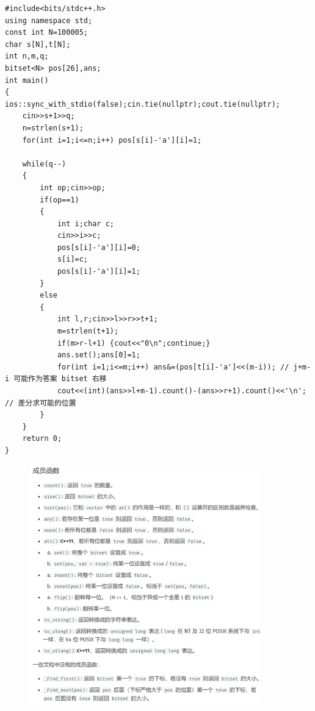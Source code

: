 \begin{verbatim}
#include<bits/stdc++.h>
using namespace std;
const int N=100005;
char s[N],t[N];
int n,m,q;
bitset<N> pos[26],ans;
int main()
{
ios::sync_with_stdio(false);cin.tie(nullptr);cout.tie(nullptr);
    cin>>s+1>>q;
    n=strlen(s+1);
    for(int i=1;i<=n;i++) pos[s[i]-'a'][i]=1;

    while(q--)
    {
        int op;cin>>op;
        if(op==1)
        {
            int i;char c;
            cin>>i>>c;
            pos[s[i]-'a'][i]=0;
            s[i]=c;
            pos[s[i]-'a'][i]=1;
        }
        else
        {
            int l,r;cin>>l>>r>>t+1;
            m=strlen(t+1);    
            if(m>r-l+1) {cout<<"0\n";continue;}
            ans.set();ans[0]=1;
            for(int i=1;i<=m;i++) ans&=(pos[t[i]-'a']<<(m-i)); // j+m-i 可能作为答案 bitset 右移
            cout<<(int)(ans>>l+m-1).count()-(ans>>r+1).count()<<'\n'; // 差分求可能的位置
        }
    }
    return 0;
}
\end{verbatim}
\begin{figure}[H]
        \centering
        \par \includegraphics[width=10cm]{images/bitset.png}
\end{figure}